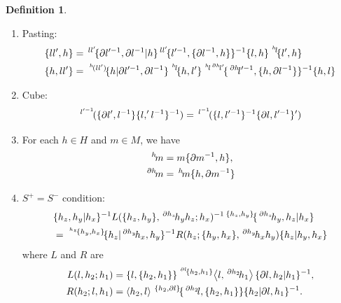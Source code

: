 \documentclass[11pt, reqno]{amsart} %
\newcommand{\act}[1]{\,\sp{#1}\!}
\theoremstyle{definition}
\newtheorem{definition}[theorem]{Definition}
\theoremstyle{remark}
\numberwithin{equation}{section}
\begin{document}
\begin{definition}
\begin{enumerate}
\begin{align}
      \end{align}
      where we have defined $\left<l,h\right> := \act{l}\{l^{-1},h\}^{-1}$.
      \begin{align}
                \label{eq:3cm_prism2-23}
        &\{\{h_2,h_1\},\act{\act{\partial h_2}h_1h_2}l\}^{-1}\act{\{h_2,h_1\}}(\act{\act{\partial h_2}h_1}\left<h_2,l\right>)\{h_2|h_1,\partial l\}^{-1} \\
        \nonumber
        &= \left<h_2,\act{h_1}l\right>\act{\{h_2,\partial\act{h_1}l\}}\{\act{\partial h_2}(\act{h_1}l),\{h_2,h_1\}\}\{h_2|\partial\act{h_1}l,h_1\}^{-1},
      \end{align}
      where we have defined $\left<h,l\right> := \act{\act{h}l}\{h,l^{-1}\}^{-1}$.
    \item \label{ax:3CM-Pasting}Pasting:
      \begin{align}
        \label{eq:3CM-Pasting}
        \{ll',h\} &= \act{ll'}\{\partial l'^{-1},\partial l^{-1}|h\}\act{ll'}\{l'^{-1},\{\partial l^{-1},h\}\}^{-1}\{l,h\}\act{\act{h}l}\{l',h\} \\
        \label{eq:3CM-Pasting2}
        \{h,ll'\} &= \act{\act{h}(ll')}\{h|\partial l'^{-1},\partial l^{-1}\}\act{\act{h}l}\{h,l'\}\act{\act{h}l\act{\partial h}l'}\{\act{\partial h}l'^{-1},\{h,\partial l^{-1}\}\}^{-1}\{h,l\}
      \end{align}
    \item \label{ax:3CM-Cube}Cube:
      \begin{equation}
        \label{eq:3CM-Cube}
        \act{l'^{-1}}(\{\partial l',l^{-1}\}\{l,'l^{-1}\}^{-1}) = \act{l^{-1}}(\{l,l'^{-1}\}^{-1}\{\partial l,l'^{-1}\}')
      \end{equation}
  \item \label{ax:3CM-2on4}For each $h\in H$ and $m\in M$, we have
  \begin{align}
    \label{eq:3CM-HonM}
    \act{h}m &= m\{\partial m^{-1},h\}, \\
    \label{eq:3CM-pHonM}
    \act{\partial h}m &= \act{h}m\{h,\partial m^{-1}\}
  \end{align}
  \item \label{ax:3CM-SpSm}$S^+=S^-$ condition:
  \begin{align*}
    &\{h_z,h_y|h_x\}^{-1}L(\{h_z,h_y\},\act{\partial h_z}h_yh_z;h_x)^{-1}\act{\{h_z,h_y\}}\{\act{\partial h_z}h_y,h_z|h_x\} \\
    &= \act{\act{h_z}\{h_y,h_x\}}\{h_z|\act{\partial h_y}h_x,h_y\}^{-1}R(h_z;\{h_y,h_x\},\act{\partial h_y}h_xh_y)\{h_z|h_y,h_x\}
  \end{align*}
  where $L$ and $R$ are
  \begin{align}
    \label{eq:defL}
    L(l,h_2;h_1) &= \{l,\{h_2,h_1\}\}\act{\act{\partial l}\{h_2,h_1\}}\left<l,\act{\partial h_2}h_1\right>\{\partial l,h_2|h_1\}^{-1}, \\
    \label{eq:defR}
    R(h_2;l,h_1) &= \left<h_2,l\right>\act{\{h_2,\partial l\}}\{\act{\partial h_2}l,\{h_2,h_1\}\}\{h_2|\partial l,h_1\}^{-1}.
  \end{align}
\end{enumerate}
\end{definition}
\end{document}
